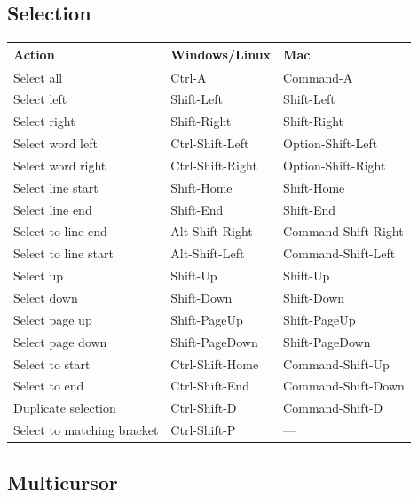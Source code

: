 \documentclass[
]{book}
\begin{document}
\hypertarget{selection}{%
\subsection{Selection}\label{selection}}

\begin{longtable}[]{@{}lll@{}}
\toprule
Action & Windows/Linux & Mac \\
\midrule
\endhead
Select all & Ctrl-A & Command-A \\
Select left & Shift-Left & Shift-Left \\
Select right & Shift-Right & Shift-Right \\
Select word left & Ctrl-Shift-Left & Option-Shift-Left \\
Select word right & Ctrl-Shift-Right & Option-Shift-Right \\
Select line start & Shift-Home & Shift-Home \\
Select line end & Shift-End & Shift-End \\
Select to line end & Alt-Shift-Right & Command-Shift-Right \\
Select to line start & Alt-Shift-Left & Command-Shift-Left \\
Select up & Shift-Up & Shift-Up \\
Select down & Shift-Down & Shift-Down \\
Select page up & Shift-PageUp & Shift-PageUp \\
Select page down & Shift-PageDown & Shift-PageDown \\
Select to start & Ctrl-Shift-Home & Command-Shift-Up \\
Select to end & Ctrl-Shift-End & Command-Shift-Down \\
Duplicate selection & Ctrl-Shift-D & Command-Shift-D \\
Select to matching bracket & Ctrl-Shift-P & --- \\
\bottomrule
\end{longtable}

\hypertarget{multicursor}{%
\subsection{Multicursor}\label{multicursor}}
\end{document}
